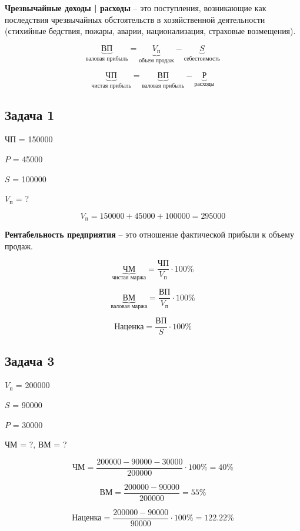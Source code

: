 \textbf{Чрезвычайные доходы | расходы} -- это поступления, возникающие как последствия чрезвычайных обстоятельств в хозяйственной деятельности (стихийные бедствия, пожары, аварии, национализация, страховые возмещения).


\begin{equation*}
    \underbrace{\text{ВП}}_\text{валовая прибыль} = \underbrace{V_\text{п}}_\text{объем продаж} - \underbrace{S}_\text{себестоимость}
\end{equation*}

\begin{equation*}
    \underbrace{\text{ЧП}}_\text{чистая прибыль} = \underbrace{\text{ВП}}_\text{валовая прибыль} - \underbrace{\text{Р}}_\text{расходы}
\end{equation*}

\subsection{Задача 1}

ЧП = 150000

$P$ = 45000

$S$ = 100000

$V_\text{п}$ = ?

\begin{equation*}
    V_\text{п} = 150000 + 45000 + 100000 = 295000
\end{equation*}

\textbf{Рентабельность предприятия} -- это отношение фактической прибыли к объему продаж.

\begin{equation*}
    \underbrace{\text{ЧМ}}_\text{чистая маржа} = \frac{\text{ЧП}}{V_\text{п}} \cdot 100 \%
\end{equation*}

\begin{equation*}
    \underbrace{\text{ВМ}}_\text{валовая маржа} = \frac{\text{ВП}}{V_\text{п}} \cdot 100 \%
\end{equation*}

\begin{equation*}
    \text{Наценка} = \frac{\text{ВП}}{S} \cdot 100 \%
\end{equation*}

\subsection{Задача 3}

$V_\text{п}$ = 200000

$S$ = 90000

$P$ = 30000

ЧМ = ?, ВМ = ?

\begin{equation*}
    \text{ЧМ} = \frac{200000 - 90000 - 30000}{200000} \cdot 100 \% = 40 \%
\end{equation*}

\begin{equation*}
    \text{ВМ} = \frac{200000 - 90000}{200000} = 55 \%
\end{equation*}

\begin{equation*}
    \text{Наценка} = \frac{200000 - 90000}{90000} \cdot 100 \% = 122.22 \%
\end{equation*}
